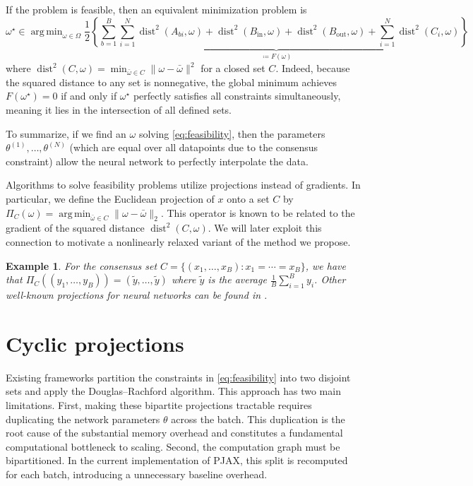 \documentclass{article}
\let\cref\crtcref
\DeclareMathOperator*{\argmin}{arg\,min}
\newcommand{\dist}{\operatorname{dist}}
\newtheorem{example}{Example}
\begin{document}
If the problem is feasible, then an equivalent minimization problem is
\[
    \omega^\star \in \argmin_{\omega\in\Omega} \underbrace{\frac{1}{2}\left\{\sum_{b=1}^B \sum_{i=1}^N \dist^2(A_{bi}, \omega)   + \dist^2(B_{\mathrm{in}}, \omega) + \dist^2(B_{\mathrm{out}}, \omega) + \sum_{i=1}^N \dist^2(C_i, \omega)\right\}}_{\coloneqq F(\omega)}
\]
where $\dist^2(C, \omega) = \min_{\bar\omega\in C} \|\omega - \bar\omega\|^2$ for a closed set $C$. Indeed, because the squared distance to any set is nonnegative, the global minimum achieves $F(\omega^\star) = 0$ if and only if $\omega^\star$ perfectly satisfies all constraints simultaneously, meaning it lies in the intersection of all defined sets.
\label{sec:feasibility}
\vspace{0.5em}
\begin{tcolorbox}
To summarize, if we find an $\omega$ solving \eqref{eq:feasibility}, then the parameters $\theta^{(1)}, \ldots, \theta^{(N)}$ (which are equal over all datapoints due to the consensus constraint) allow the neural network to perfectly interpolate the data.
\end{tcolorbox}
\vspace{0.5em}

Algorithms to solve feasibility problems utilize projections instead of gradients. In particular, we define the Euclidean projection of $x$ onto a set $C$ by $\Pi_C(\omega) = \argmin_{\bar \omega\in C} \|\omega - \bar\omega\|_2$. This operator is known to be related to the gradient of the squared distance $\dist^2(C,\omega)$. We will later exploit this connection to motivate a nonlinearly relaxed variant of the method we propose.

\begin{example} \label{ex:consensus}
    For the consensus set $C = \{(x_1, \ldots, x_B) : x_1 = \cdots = x_B\}$, we have that $\Pi_C((y_1, \ldots, y_B)) = (\tilde y, \ldots, \tilde y)$ where $\tilde y$ is the average $\frac{1}{B}\sum_{i=1}^B y_i$. Other well-known projections for neural networks can be found in \cref{sec:projections}.
\end{example}

\section{Cyclic projections}
Existing frameworks \cite{elser2019learning,bergmeister2025projection} partition the constraints in \eqref{eq:feasibility} into two disjoint sets and apply the Douglas--Rachford algorithm. This approach has two main limitations. First, making these bipartite projections tractable requires duplicating the network parameters $\theta$ across the batch. This duplication is the root cause of the substantial memory overhead and constitutes a fundamental computational bottleneck to scaling. Second, the computation graph must be bipartitioned. In the current implementation of PJAX, this split is recomputed for each batch, introducing a unnecessary baseline overhead.
\end{document}
